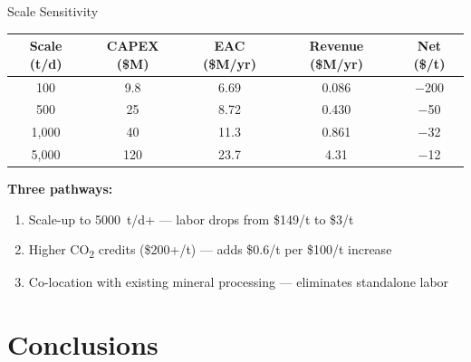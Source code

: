 \documentclass[aspectratio=169]{beamer}
\begin{document}
\begin{frame}{Scale Sensitivity}

\begin{table}
\centering\small
\begin{tabular}{ccccc}
\toprule
\textbf{Scale (t/d)} & \textbf{CAPEX (\$M)} & \textbf{EAC (\$M/yr)} & \textbf{Revenue (\$M/yr)} & \textbf{Net (\$/t)} \\
\midrule
100 & 9.8 & 6.69 & 0.086 & \textcolor{cost}{$-$200} \\
500 & 25 & 8.72 & 0.430 & \textcolor{cost}{$-$50} \\
1,000 & 40 & 11.3 & 0.861 & \textcolor{cost}{$-$32} \\
\rowcolor{StepYellow!15}
5,000 & 120 & 23.7 & 4.31 & \textcolor{cost}{$-$12} \\
\bottomrule
\end{tabular}
\end{table}

\vspace{0.5em}
\textbf{Three pathways:}
\begin{enumerate}
\item Scale-up to \SI{5000}{t/d}+ --- labor drops from \$149/t to \$3/t
\item Higher CO\textsubscript{2} credits (\$200+/t) --- adds \$0.6/t per \$100/t increase
\item Co-location with existing mineral processing --- eliminates standalone labor
\end{enumerate}
\end{frame}

\section{Conclusions}
\end{document}
